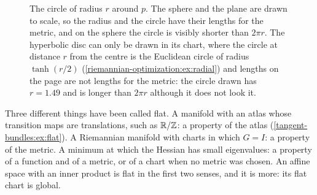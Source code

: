 \begin{notechapter}
\begin{figure}[ht]
\centering
{}
\caption{The circle of radius $r$ around $p$. The sphere and the plane
are drawn to scale, so the radius and the circle have their lengths for
the metric, and on the sphere the circle is visibly shorter than
$2\pi r$. The hyperbolic disc can only be drawn in its chart, where the
circle at distance $r$ from the centre is the Euclidean circle of radius
$\tanh(r/2)$ (\cref{riemannian-optimization:ex:radial}) and lengths on
the page are not lengths for the metric: the circle drawn has
$r = 1.49$ and is longer than $2\pi r$ although it does not look it.}
\label{riemannian-optimization:fig:circles}
\end{figure}

\begin{keyidea}
Three different things have been called flat. A manifold with an atlas
whose transition maps are translations, such as $\mathbb{R}/\mathbb{Z}$: a property of
the atlas (\cref{tangent-bundles:ex:flat}). A Riemannian manifold with
charts in which $G = I$: a property of the metric. A minimum at which the
Hessian has small eigenvalues: a property of a function and of a metric,
or of a chart when no metric was chosen. An affine space with an inner
product is flat in the first two senses, and it is more: its flat chart
is global.
\end{keyidea}


\end{notechapter}
